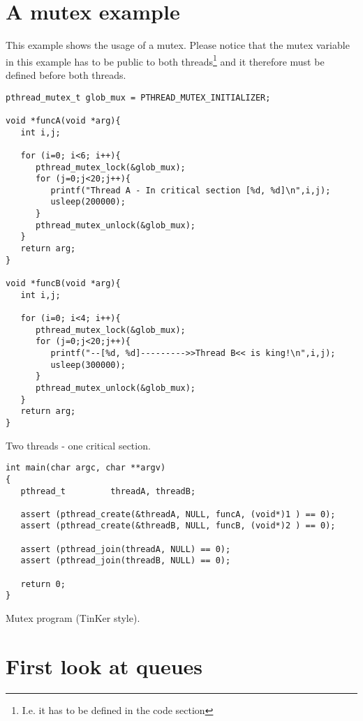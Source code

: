 \chapter{A mutex example}
This example shows the usage of a mutex. Please notice that the mutex variable in this example has to be public to both threads\footnote{I.e. it has to be defined in the code section} and it therefore must be defined before both threads.

\begin{table}[!hbp]
\begin{verbatim}
pthread_mutex_t glob_mux = PTHREAD_MUTEX_INITIALIZER;

void *funcA(void *arg){
   int i,j;

   for (i=0; i<6; i++){
      pthread_mutex_lock(&glob_mux);
      for (j=0;j<20;j++){
         printf("Thread A - In critical section [%d, %d]\n",i,j);
         usleep(200000);
      }
      pthread_mutex_unlock(&glob_mux);
   }
   return arg;
}

void *funcB(void *arg){
   int i,j;

   for (i=0; i<4; i++){
      pthread_mutex_lock(&glob_mux);
      for (j=0;j<20;j++){
         printf("--[%d, %d]--------->>Thread B<< is king!\n",i,j);
         usleep(300000);
      }
      pthread_mutex_unlock(&glob_mux);
   }
   return arg;
}
\end{verbatim}
\caption{Two threads - one critical section.\label{mutex_threads}}
\end{table}

\begin{table}[!hbp]
\begin{verbatim}
int main(char argc, char **argv)
{
   pthread_t         threadA, threadB;   

   assert (pthread_create(&threadA, NULL, funcA, (void*)1 ) == 0);
   assert (pthread_create(&threadB, NULL, funcB, (void*)2 ) == 0);

   assert (pthread_join(threadA, NULL) == 0);
   assert (pthread_join(threadB, NULL) == 0);

   return 0;
}
\end{verbatim}
\caption{Mutex program (TinKer style).\label{mutex1}}
\end{table}
\chapter{First look at queues}

